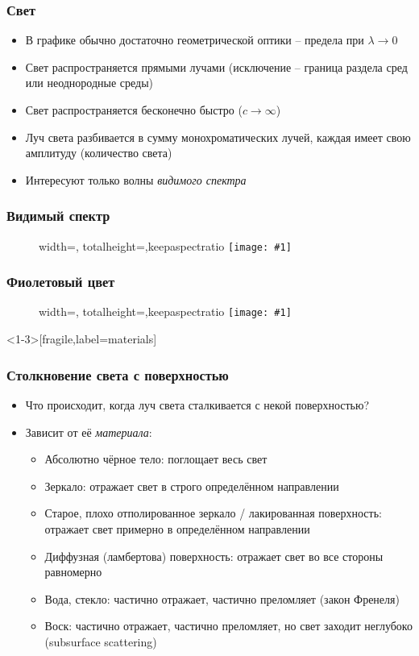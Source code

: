 \documentclass[10pt]{beamer}
\newcommand{\slideimage}[1]{
  \begin{figure}
    \begin{adjustbox}{width=\textwidth, totalheight=\textheight-2\baselineskip-2\baselineskip,keepaspectratio}
      \texttt{[image: \#1]}
    \end{adjustbox}
  \end{figure}
}
\begin{document}
\begin{frame}[fragile]
\frametitle{Свет}
\begin{itemize}
\item В графике обычно достаточно геометрической оптики -- предела при \begin{math}\lambda\rightarrow 0\end{math}
\pause
\item Свет распространяется прямыми лучами (исключение -- граница раздела сред или неоднородные среды)
\pause
\item Свет распространяется бесконечно быстро (\begin{math}c \rightarrow \infty\end{math})
\pause
\item Луч света разбивается в сумму монохроматических лучей, каждая имеет свою амплитуду (количество света)
\pause
\item Интересуют только волны \textit{видимого спектра}
\end{itemize}
\end{frame}

\begin{frame}[fragile]
\frametitle{Видимый спектр}
\slideimage{visible-spectrum.jpg}
\end{frame}

\begin{frame}[fragile]
\frametitle{Фиолетовый цвет}
\slideimage{blue-red-spectrum.png}
\end{frame}

\begin{frame}<1-3>[fragile,label=materials]
\frametitle{Столкновение света с поверхностью}
\begin{itemize}
\item Что происходит, когда луч света сталкивается с некой поверхностью?
\pause
\item Зависит от её \textit{материала}:
\pause
\begin{itemize}
\item Абсолютно чёрное тело: поглощает весь свет
\pause
\item Зеркало: отражает свет в строго определённом направлении
\pause
\item Старое, плохо отполированное зеркало / лакированная поверхность: отражает свет примерно в определённом направлении
\pause
\item Диффузная (ламбертова) поверхность: отражает свет во все стороны равномерно
\pause
\item Вода, стекло: частично отражает, частично преломляет (закон Френеля)
\pause
\item Воск: частично отражает, частично преломляет, но свет заходит неглубоко (subsurface scattering)
\end{itemize}
\end{itemize}
\end{frame}
\end{document}
